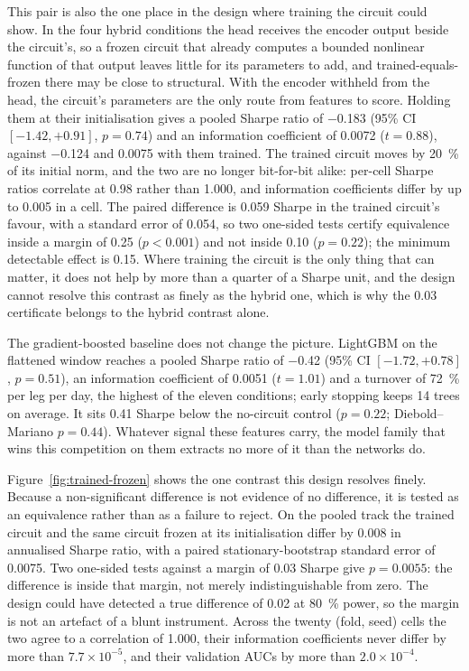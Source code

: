 This pair is also the one place in the design where training the circuit
could show. In the four hybrid conditions the head receives the encoder output
beside the circuit's, so a frozen circuit that already computes a bounded
nonlinear function of that output leaves little for its parameters to add, and
trained-equals-frozen there may be close to structural.
With the encoder withheld from the head, the circuit's parameters are the only
route from features to score. Holding them at their initialisation gives a
pooled Sharpe ratio of \num{-0.183} (95\% CI $[-1.42, +0.91]$, $p = 0.74$)
and an information coefficient of \num{0.0072} ($t = 0.88$), against
\num{-0.124} and \num{0.0075} with them trained. The trained circuit moves by
\SI{20}{\percent} of its initial norm, and the two are no longer
bit-for-bit alike: per-cell Sharpe ratios correlate at \num{0.98} rather than
\num{1.000}, and information coefficients differ by up to \num{0.005} in a
cell. The paired difference is \num{+0.059} Sharpe in the trained circuit's
favour, with a standard error of \num{0.054}, so two one-sided tests certify
equivalence inside a margin of \num{0.25} ($p < 0.001$) and not inside
\num{0.10} ($p = 0.22$); the minimum detectable effect is \num{0.15}. Where
training the circuit is the only thing that can matter, it does not help by
more than a quarter of a Sharpe unit, and the design cannot resolve this
contrast as finely as the hybrid one, which is why the \num{0.03} certificate
belongs to the hybrid contrast alone.

The gradient-boosted baseline does not change the picture. LightGBM on the
flattened window reaches a pooled Sharpe ratio of \num{-0.42} (95\% CI
$[-1.72, +0.78]$, $p = 0.51$), an information coefficient of \num{0.0051}
($t = 1.01$) and a turnover of \SI{72}{\percent} per leg per day, the highest
of the eleven conditions; early stopping keeps \num{14} trees on average. It sits
\num{0.41} Sharpe below the no-circuit control ($p = 0.22$; Diebold--Mariano
$p = 0.44$). Whatever signal these features carry, the model family that wins
this competition on them extracts no more of it than the networks do.

Figure~\ref{fig:trained-frozen} shows the one contrast this design resolves
finely. Because a non-significant difference is not evidence of no difference,
it is tested as an equivalence rather than as a failure to reject. On the pooled track the trained circuit and the same circuit frozen at
its initialisation differ by \num{0.008} in annualised Sharpe ratio, with a
paired stationary-bootstrap standard error of \num{0.0075}. Two one-sided
tests against a margin of \num{0.03} Sharpe give $p = \num{0.0055}$: the
difference is inside that margin, not merely indistinguishable from zero. The
design could have detected a true difference of \num{0.02} at \SI{80}{\percent}
power, so the margin is not an artefact of a blunt instrument. Across the
twenty (fold, seed) cells the two agree to a correlation of \num{1.000}, their
information coefficients never differ by more than $7.7\times10^{-5}$, and their
validation AUCs by more than $2.0\times10^{-4}$.

